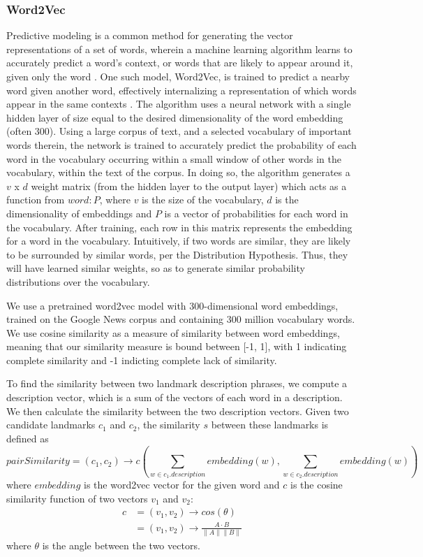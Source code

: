 \subsubsection{Word2Vec}
Predictive modeling is a common method for generating the vector representations of a set of words, wherein a machine learning algorithm learns to accurately predict a word's context, or words that are likely to appear around it, given only the word \cite{baroni2014don}. One such model, Word2Vec, is trained to predict a nearby word given another word, effectively internalizing a representation of which words appear in the same contexts \cite{mikolov2013efficient}. The algorithm uses a neural network with a single hidden layer of size equal to the desired dimensionality of the word embedding (often 300).  Using a large corpus of text, and a selected vocabulary of important words therein, the network is trained to accurately predict the probability of each word in the vocabulary occurring within a small window of other words in the vocabulary, within the text of the corpus. In doing so, the algorithm generates a $v$ x $d$ weight matrix (from the hidden layer to the output layer) which acts as a function from $word : P$, where $v$ is the size of the vocabulary, $d$ is the dimensionality of embeddings and $P$ is a vector of probabilities for each word in the vocabulary. After training, each row in this matrix represents the embedding for a word in the vocabulary. Intuitively, if two words are similar, they are likely to be surrounded by similar words, per the Distribution Hypothesis. Thus, they will have learned similar weights, so as to generate similar probability distributions over the vocabulary.

We use a pretrained word2vec model \cite{word2vec} with 300-dimensional word embeddings, trained on the Google News corpus and containing 300 million vocabulary words. We use cosine similarity as a measure of similarity between word embeddings, meaning that our similarity measure is bound between [-1, 1], with 1 indicating complete similarity and -1 indicting complete lack of similarity. 

To find the similarity between two landmark description phrases, we compute a description vector, which is a sum of the vectors of each word in a description. We then calculate the similarity between the two description vectors. Given two candidate landmarks $c_1$ and $c_2$, the similarity $s$ between these landmarks is defined as
\begin{equation}\label{eq:landmrkSimilarity}
    pairSimilarity = (c_1, c_2) \longrightarrow c(\sum\limits_{w \in c_1.description} embedding(w), \sum\limits_{w \in c_2.description} embedding(w))
\end{equation}
where $embedding$ is the word2vec vector for the given word and $c$ is the cosine similarity function of two vectors $v_1$ and $v_2$:
\begin{align}\label{eq:cosineSimilarity}
    c &= (v_1, v_2) \longrightarrow cos(\theta) \\
      &= (v_1, v_2) \longrightarrow \frac{A \cdot B}{\parallel A \parallel \parallel B \parallel}
\end{align}
where $\theta$ is the angle between the two vectors.

